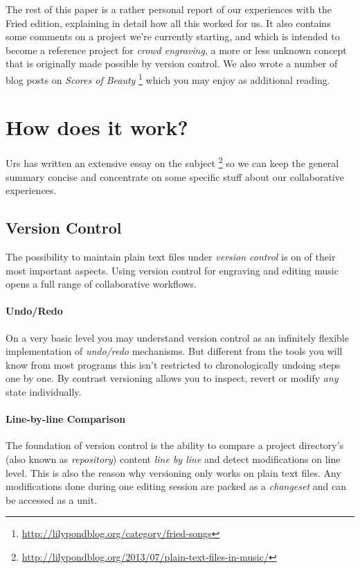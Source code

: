 \documentclass[11pt,a4paper]{article}
\begin{document}
\medskip
The rest of this paper is a rather personal report of our experiences with the Fried
edition, explaining in detail how all this worked for us.  It also contains
some comments on a project we're currently starting, and which is intended to become
a reference project for \emph{crowd engraving}, a more or less unknown concept that is
originally made possible by version control. We also wrote a number of blog posts on
\emph{Scores of Beauty}%
\footnote{\url{http://lilypondblog.org/category/fried-songs}}
which you may enjoy as additional reading.

\section{How does it work?}
Urs has written an extensive essay on the subject%
\footnote{\url{http://lilypondblog.org/2013/07/plain-text-files-in-music/}}
so we can keep the general summary concise and concentrate on some specific stuff
about our collaborative experiences.

\subsection{Version Control}
The possibility to maintain plain text files under \emph{version control} is on of
their most important aspects. Using version control for engraving and editing music
opens a full range of collaborative workflows.

\paragraph{Undo/Redo}
On a very basic level you may understand version control as an infinitely flexible
implementation of \emph{undo/redo} mechanisms. But different from the tools you will
know from most programs this isn't restricted to chronologically undoing steps one by
one. By contrast versioning allows you to inspect, revert or modify \emph{any} state
individually.

\paragraph{Line-by-line Comparison}
The foundation of version control is the ability to compare a project directory's (also
known as \emph{repository}) content \emph{line by line} and detect modifications on line
level. This is also the reason why versioning only works on plain text files.
Any modifications done during one editing session are packed as a \emph{changeset} and
can be accessed as a unit.
\end{document}
